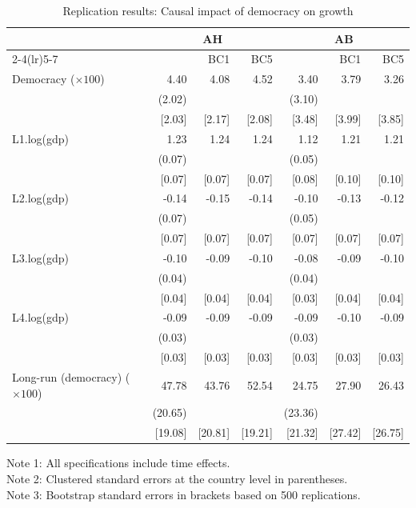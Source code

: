 \begin{table}[htbp]
\centering
\caption{Replication results: Causal impact of democracy on growth}
\label{tab:democracy-replication-results}
\begin{tabular}{lrrrrrr}
\toprule
 & \multicolumn{3}{c}{AH} & \multicolumn{3}{c}{AB} \\
\cmidrule(lr){2-4}\cmidrule(lr){5-7}
 &  & BC1 & BC5 &  & BC1 & BC5 \\
\midrule
Democracy ($\times 100$) & 4.40 & 4.08 & 4.52 & 3.40 & 3.79 & 3.26 \\
 & (2.02) &  &  & (3.10) &  &  \\
 & [2.03] & [2.17] & [2.08] & [3.48] & [3.99] & [3.85] \\

L1.log(gdp) & 1.23 & 1.24 & 1.24 & 1.12 & 1.21 & 1.21 \\
 & (0.07) &  &  & (0.05) &  &  \\
 & [0.07] & [0.07] & [0.07] & [0.08] & [0.10] & [0.10] \\

L2.log(gdp) & -0.14 & -0.15 & -0.14 & -0.10 & -0.13 & -0.12 \\
 & (0.07) &  &  & (0.05) &  &  \\
 & [0.07] & [0.07] & [0.07] & [0.07] & [0.07] & [0.07] \\

L3.log(gdp) & -0.10 & -0.09 & -0.10 & -0.08 & -0.09 & -0.10 \\
 & (0.04) &  &  & (0.04) &  &  \\
 & [0.04] & [0.04] & [0.04] & [0.03] & [0.04] & [0.04] \\

L4.log(gdp) & -0.09 & -0.09 & -0.09 & -0.09 & -0.10 & -0.09 \\
 & (0.03) &  &  & (0.03) &  &  \\
 & [0.03] & [0.03] & [0.03] & [0.03] & [0.03] & [0.03] \\

\midrule
Long-run (democracy) ($\times 100$) & 47.78 & 43.76 & 52.54 & 24.75 & 27.90 & 26.43 \\
 & (20.65) &  &  & (23.36) &  &  \\
 & [19.08] & [20.81] & [19.21] & [21.32] & [27.42] & [26.75] \\
\bottomrule
\end{tabular}
\vspace{0.3em}
\begin{minipage}{0.98\linewidth}
\footnotesize
Note 1: All specifications include time effects.\\
Note 2: Clustered standard errors at the country level in parentheses.\\
Note 3: Bootstrap standard errors in brackets based on 500 replications.
\end{minipage}
\end{table}
